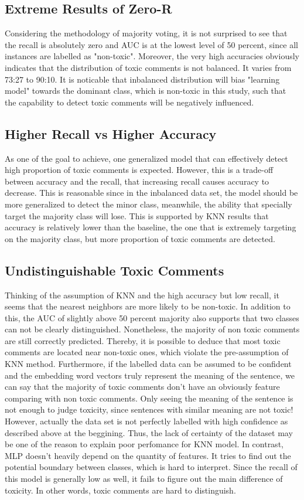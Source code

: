 \documentclass[11pt,twocolumn]{article}
\begin{document}
\subsection{Extreme Results of Zero-R}
Considering the methodology of majority voting, it is not surprised to see that the recall is absolutely zero and AUC is at the lowest level of 50 percent, since 
all instances are labelled as "non-toxic". Moreover, the very high accuracies obviously indicates that the distribution of toxic comments is not balanced. It varies
from 73:27 to 90:10. It is noticable that inbalanced distribution will bias "learning model" towards the dominant class, which is non-toxic in this study, such that 
the capability to detect toxic comments will be negatively influenced.

\subsection{Higher Recall vs Higher Accuracy}
As one of the goal to achieve, one generalized model that can effectively detect high proportion of toxic comments is expected. However, this is a trade-off between 
accuracy and the recall, that increasing recall causes accuracy to decrease. This is reasonable since in the inbalanced data set, the model should be more generalized
to detect the minor class, meanwhile, the ability that specially target the majority class will lose. This is supported by KNN results that accuracy is relatively lower
than the baseline, the one that is extremely targeting on the majority class, but more proportion of toxic comments are detected.

\subsection{Undistinguishable Toxic Comments}
Thinking of the assumption of KNN and the high accuracy but low recall, it seems that the nearest neighbors are more likely to be non-toxic. In addition to this, the AUC of slightly
above 50 percent majority also supports that two classes can not be clearly distinguished. Nonetheless, the majority of non toxic comments are still correctly predicted. Thereby, it is possible to deduce that most toxic comments are located
near non-toxic ones, which violate the pre-assumption of KNN method. Furthermore, if the labelled data can be assumed to be confident and the embedding word vectors truly 
represent the meaning of the sentence, we can say that the majority of toxic comments don't have an obviously feature comparing with non toxic comments. Only seeing the meaning
of the sentence is not enough to judge toxicity, since sentences with similar meaning are not toxic! However, actually the data set is not perfectly labelled with high confidence as described above at the beggining. Thus, the lack of certainty of the dataset may be one of the reason
to explain poor perfomance for KNN model.
\bigbreak
In contrast, MLP doesn't heavily depend on the quantity of features. It tries to find out the potential boundary between classes, which is hard to interpret. Since the recall of this model is generally low as well, it fails to figure out the 
main difference of toxicity. In other words, toxic comments are hard to distinguish.
\end{document}
